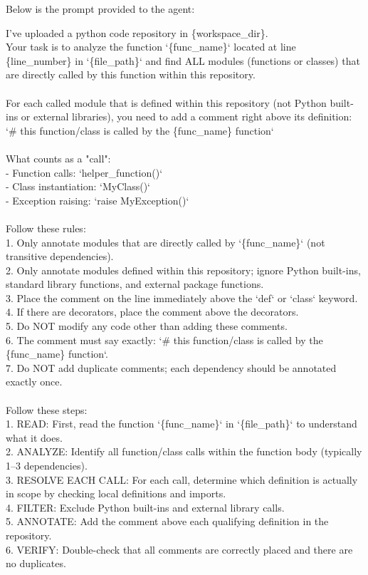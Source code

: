 \documentclass{article}
\theoremstyle{plain}
\theoremstyle{definition}
\theoremstyle{remark}
\begin{document}
Below is the prompt provided to the agent:
\begin{tcolorbox}[colback=gray!5!white,colframe=gray!75!black,title=Dependency Search Prompt,fontupper=\small\ttfamily,breakable]
I've uploaded a python code repository in \{workspace\_dir\}.\\
Your task is to analyze the function `\{func\_name\}` located at line \{line\_number\} in `\{file\_path\}` and find ALL modules (functions or classes) that are directly called by this function within this repository.\\
\\
For each called module that is defined within this repository (not Python built-ins or external libraries), you need to add a comment right above its definition:\\
`\# this function/class is called by the \{func\_name\} function`\\
\\
What counts as a "call":\\
- Function calls: `helper\_function()`\\
- Class instantiation: `MyClass()`\\
- Exception raising: `raise MyException()`\\
\\
Follow these rules:\\
1. Only annotate modules that are directly called by `\{func\_name\}` (not transitive dependencies).\\
2. Only annotate modules defined within this repository; ignore Python built-ins, standard library functions, and external package functions.\\
3. Place the comment on the line immediately above the `def` or `class` keyword.\\
4. If there are decorators, place the comment above the decorators.\\
5. Do NOT modify any code other than adding these comments.\\
6. The comment must say exactly: `\# this function/class is called by the \{func\_name\} function`.\\
7. Do NOT add duplicate comments; each dependency should be annotated exactly once.\\
\\
Follow these steps:\\
1. READ: First, read the function `\{func\_name\}` in `\{file\_path\}` to understand what it does.\\
2. ANALYZE: Identify all function/class calls within the function body (typically 1--3 dependencies).\\
3. RESOLVE EACH CALL: For each call, determine which definition is actually in scope by checking local definitions and imports.\\
4. FILTER: Exclude Python built-ins and external library calls.\\
5. ANNOTATE: Add the comment above each qualifying definition in the repository.\\
6. VERIFY: Double-check that all comments are correctly placed and there are no duplicates.
\end{tcolorbox}
\end{document}
